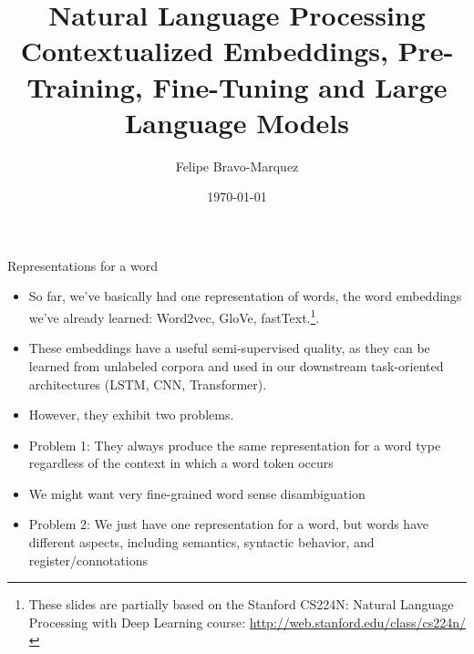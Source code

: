 \documentclass[handout]{beamer}
\title{Natural Language Processing \\ Contextualized Embeddings, Pre-Training, Fine-Tuning and Large Language Models}
\author[Felipe Bravo Márquez]{\footnotesize
 \textcolor[rgb]{0.00,0.00,1.00}{Felipe Bravo-Marquez}}
\date{\today}
\begin{document}
\begin{frame}
\titlepage


\end{frame}



\begin{frame}{Representations for a word}
\begin{scriptsize}
\begin{itemize}
\item So far, we've basically had one representation of words, the word embeddings we've already learned:  Word2vec, GloVe, fastText.\footnote{These slides are partially based on the Stanford CS224N: Natural Language Processing with Deep Learning course: \url{http://web.stanford.edu/class/cs224n/}}.
\item These embeddings have a useful semi-supervised quality, as they can be learned from unlabeled corpora and used in our downstream task-oriented architectures (LSTM, CNN, Transformer).

\item However, they exhibit two problems.
\item  Problem 1: They always produce the same representation for a word type regardless of the context in which a word token occurs
\item  We might want very fine-grained word sense disambiguation
\item Problem 2: We just have one representation for a word, but words have different aspects, including semantics, syntactic behavior, and register/connotations

 

\end{itemize}
\end{scriptsize}
\end{frame}
\end{document}
